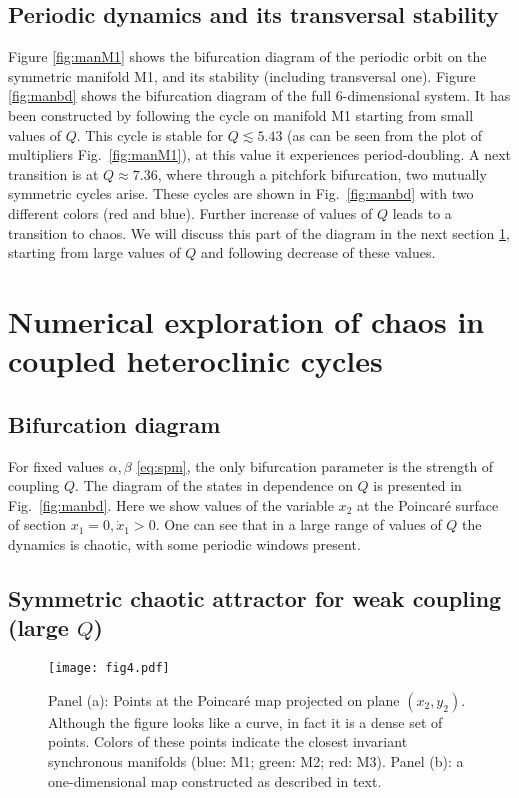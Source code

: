 \documentclass[3p,number,review,sort&compress]{elsarticle}
\begin{document}
\subsection{Periodic dynamics and its transversal stability}

\label{sec:nesm}

Figure \ref{fig:manM1} shows the bifurcation diagram of the 
periodic orbit on the symmetric manifold M1, 
and its stability (including transversal one).
Figure \ref{fig:manbd} shows the bifurcation diagram of the full 6-dimensional system. 
It has been constructed by following the cycle on manifold M1 starting from 
small values of $Q$. This cycle is stable for $Q\lesssim 5.43$ (as can be seen from the plot of multipliers Fig.~\ref{fig:manM1}), at this value it experiences
period-doubling.  A next transition is at $Q\approx 7.36$, where through a pitchfork bifurcation, two mutually symmetric cycles arise. These cycles are shown in Fig.~\ref{fig:manbd} with two different colors (red and blue). Further increase of values of $Q$ leads to a transition to chaos. We will discuss this part of the diagram in the next section \ref{sec:nexp}, starting from large values of $Q$ and following decrease of these values.


\section{Numerical exploration of chaos in coupled heteroclinic cycles}
\label{sec:nexp}
\subsection{Bifurcation diagram}
For fixed values $\alpha,\beta$ \eqref{eq:spm}, the only bifurcation parameter is the strength of coupling $Q$. The diagram of the states
in dependence on $Q$ is presented in Fig.~\ref{fig:manbd}. Here
we show  values of the variable $x_2$
at the Poincar\'e surface of section $x_1=0,\dot x_1>0$. One can see that in
a large range of values of $Q$ the dynamics is chaotic, with some periodic windows present. 

\subsection{Symmetric chaotic attractor for weak coupling (large $Q$)}


\begin{figure}[!htb]
\centering
\texttt{[image: fig4.pdf]}
\caption{Panel (a): Points at the Poincar\'e map projected on plane $(x_2,y_2)$.
Although the figure looks like a curve, in fact it is a dense set of points. Colors of these points indicate the closest invariant synchronous manifolds 
(blue: M1; green: M2; red: M3). Panel (b): a one-dimensional map constructed as described in text.
}
\label{fig:pm1}
\end{figure}
\end{document}

